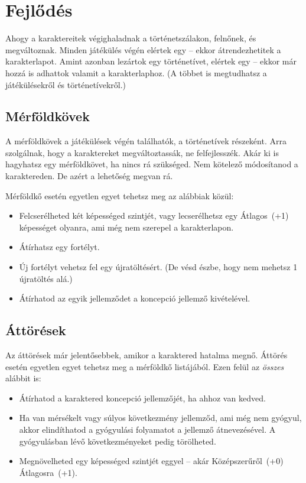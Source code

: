 \chapter{Fejlődés}

Ahogy a karaktereitek végighaladnak a történetszálakon, felnőnek, és megváltoznak. Minden játékülés végén elértek egy  – ekkor átrendezhetitek a karakterlapot. Amint azonban lezártok egy történetívet, elértek egy  – ekkor már hozzá is adhattok valamit a karakterlaphoz. (A  többet is megtudhatsz a játékülésekről és történetívekről.)

\section{Mérföldkövek}

A mérföldkövek a játékülések végén találhatók, a történetívek részeként. Arra szolgálnak, hogy a karaktereket megváltoztassák, ne felfejlesszék. Akár ki is hagyhatsz egy mérföldkövet, ha nincs rá szükséged. Nem kötelező módosítanod a karaktereden. De azért a lehetőség megvan rá.

Mérföldkő esetén egyetlen egyet tehetsz meg az alábbiak közül:

\begin{itemize}
    \item Felcserélheted két képességed szintjét, vagy lecserélhetsz egy Átlagos~(+1) képességet olyanra, ami még nem szerepel a karakterlapon.
    \item Átírhatsz egy fortélyt.
    \item Új fortélyt vehetsz fel egy újratöltésért. (De vésd észbe, hogy nem mehetsz 1 újratöltés alá.)
    \item Átírhatod az egyik jellemződet a koncepció jellemző kivételével.
\end{itemize}

\section{Áttörések}

Az áttörések már jelentősebbek, amikor a karaktered hatalma megnő. Áttörés esetén egyetlen egyet tehetsz meg a mérföldkő listájából. Ezen felül az \emph{összes} alábbit is:

\begin{itemize}
    \item Átírhatod a karaktered koncepció jellemzőjét, ha ahhoz van kedved.
    \item Ha van mérsékelt vagy súlyos következmény jellemződ, ami még nem gyógyul, akkor elindíthatod a gyógyulási folyamatot a jellemző átnevezésével. A gyógyulásban lévő következményeket pedig törölheted.
    \item Megnövelheted egy képességed szintjét eggyel – akár Középszerűről~(+0) Átlagosra~(+1).
\end{itemize}

